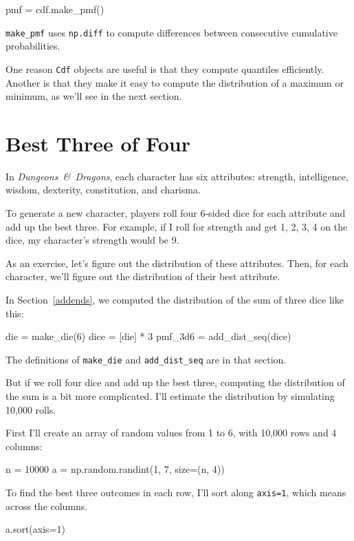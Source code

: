 \documentclass[12pt]{book}
\theoremstyle{exercise}
\newcommand{\py}[1]{{\tt #1}}%
\begin{document}
\begin{code}
pmf = cdf.make_pmf()
\end{code}

\py{make_pmf} uses \py{np.diff} to compute differences between consecutive cumulative probabilities.

One reason \py{Cdf} objects are useful is that they compute quantiles efficiently.
Another is that they make it easy to compute the distribution of a maximum or minimum, as we'll see in the next section.


\section{Best Three of Four}

In {\it Dungeons~\&~Dragons}, each character has six attributes: strength, intelligence, wisdom, dexterity, constitution, and charisma.

To generate a new character, players roll four 6-sided dice for each attribute and add up the best three.
For example, if I roll for strength and get 1, 2, 3, 4 on the dice, my character's strength would be 9.

As an exercise, let's figure out the distribution of these attributes.
Then, for each character, we'll figure out the distribution of their best attribute.

In Section~\ref{addends}, we computed the distribution of the sum of three dice like this:

\begin{code}
die = make_die(6)
dice = [die] * 3
pmf_3d6 = add_dist_seq(dice)
\end{code}

The definitions of \py{make_die} and \py{add_dist_seq} are in that section.

But if we roll four dice and add up the best three, computing the distribution of the sum is a bit more complicated.
I'll estimate the distribution by simulating 10,000 rolls.

First I'll create an array of random values from 1 to 6, with 10,000 rows and 4 columns:

\begin{code}
n = 10000
a = np.random.randint(1, 7, size=(n, 4))
\end{code}

To find the best three outcomes in each row, I'll sort along \py{axis=1}, which means across the columns.

\begin{code}
a.sort(axis=1)
\end{code}
\end{document}
